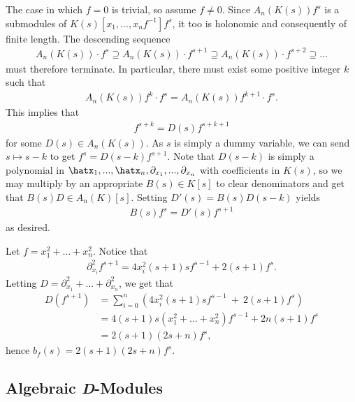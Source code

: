 \begin{prf}
	The case in which $f = 0$ is trivial, so assume $f\neq 0$. Since $A_n(K(s))f^s$ is a submodules of $K(s)[x_1,...,x_nf^{-1}]f^s$, it too is holonomic and consequently of finite length. The descending sequence
	\begin{align*}
		A_n(K(s))\cdot f^s \supseteq A_n(K(s))\cdot f^{s+1} \supseteq A_n(K(s))\cdot f^{s+2} \supseteq ...
	\end{align*}
	must therefore terminate. In particular, there must exist some positive integer $k$ such that
	\begin{align*}
		A_n(K(s))f^k\cdot f^s = A_n(K(s))f^{k+1}\cdot f^s.
	\end{align*}
	This implies that
	\begin{align*}
		f^{s+k} = D(s)f^{s+k+1}
	\end{align*}
	for some $D(s) \in A_n(K(s))$. As $s$ is simply a dummy variable, we can send $s\mapsto s - k$ to get $f^s = D(s-k)f^{s+1}$. Note that $D(s-k)$ is simply a polynomial in $\hatx_1,...,\hatx_n,\partial_{x_1},...,\partial_{x_n}$ with coefficients in $K(s)$, so we may multiply by an appropriate $B(s) \in K[s]$ to clear denominators and get that $B(s)D \in A_n(K)[s]$. Setting $D'(s) = B(s)D(s-k)$ yields
	\begin{align*}
		B(s)f^s = D'(s)f^{s+1}
	\end{align*}
	as desired.
\end{prf}
\begin{example}\label{example:explicit-b-function1}
	Let $f = x_1^2+...+x_n^2$. Notice that
	\begin{align*}
		\partial_{x_i}^2 f^{s+1} = 4x_i^2(s+1)sf^{s-1} + 2(s+1)f^s.
	\end{align*}
	Letting $D = \partial_{x_1}^2 + ... + \partial_{x_n}^2$, we get that
	\begin{align*}
		D(f^{s+1})
		  &= \sum_{i=0}^n \left(4x_i^2(s+1)sf^{s-1} ~+~ 2(s+1)f^s\right) \\
		  &= 4(s+1)s(x_1^2+...+x_n^2)f^{s-1} + 2n(s+1)f^s \\
		  &= 2(s+1)(2s+ n)f^s,
	\end{align*}
	hence $b_f(s) = 2(s+1)(2s+n)f^s$.
\end{example}


\subsection{Algebraic \textit{D}-Modules}\label{sec:d-mod-smooth-varieties}

